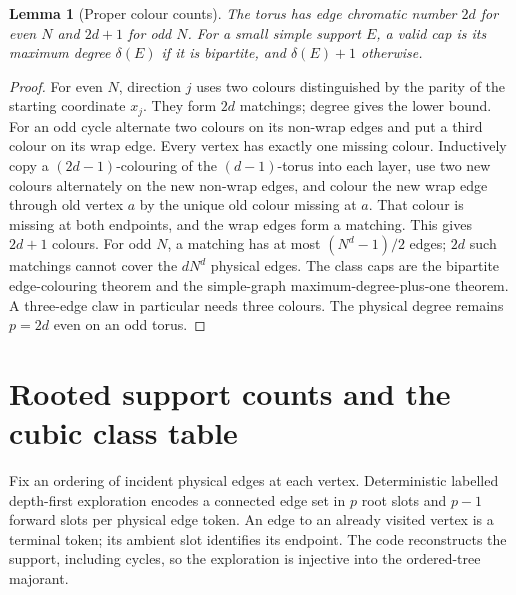 \documentclass[11pt]{article}
\theoremstyle{plain}
\newtheorem{lemma}{Lemma}
\theoremstyle{remark}
\begin{document}
\begin{lemma}[Proper colour counts]\label{lem:colours}
The torus has edge chromatic number $2d$ for even $N$ and $2d+1$ for odd $N$.
For a small simple support $E$, a valid cap is its maximum degree $\delta(E)$
if it is bipartite, and $\delta(E)+1$ otherwise.
\end{lemma}
\begin{proof}
For even $N$, direction $j$ uses two colours distinguished by the parity
of the starting coordinate $x_j$. They form $2d$ matchings; degree gives
the lower bound.
For an odd cycle alternate two colours on its non-wrap edges and put a
third colour on its wrap edge. Every vertex has exactly one missing colour.
Inductively copy a $(2d-1)$-colouring of the $(d-1)$-torus into each layer,
use two new colours alternately on the new non-wrap edges, and colour the
new wrap edge through old vertex $a$ by the unique old colour missing at $a$.
That colour is missing at both endpoints, and the wrap edges form a matching.
This gives $2d+1$ colours. For odd $N$, a matching has at most
$(N^d-1)/2$ edges; $2d$ such matchings cannot cover the $dN^d$ physical edges.
The class caps are the bipartite edge-colouring theorem and the simple-graph
maximum-degree-plus-one theorem. A three-edge claw in particular needs three
colours. The physical degree remains $p=2d$ even on an odd torus.
\end{proof}

\section{Rooted support counts and the cubic class table}\label{sec:counting}

Fix an ordering of incident physical edges at each vertex. Deterministic
labelled depth-first exploration encodes a connected edge set in $p$ root
slots and $p-1$ forward slots per physical edge token. An edge to an already
visited vertex is a terminal token; its ambient slot identifies its endpoint.
The code reconstructs the support, including cycles, so the exploration is
injective into the ordered-tree majorant.
\end{document}
